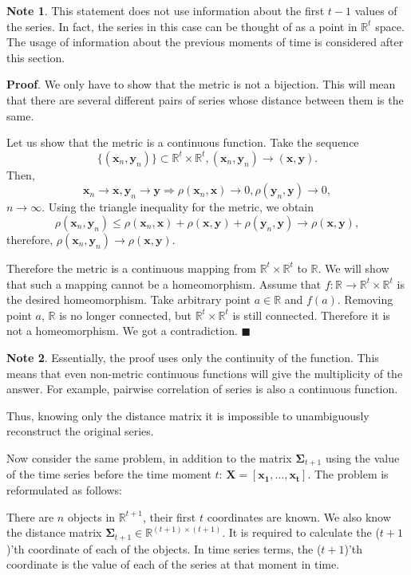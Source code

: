 \documentclass[12pt]{article}
\begin{document}
\textbf{Note 1}. This statement does not use information about the first $t-1$ values of the series. In fact, the series in this case can be thought of as a point in $\mathbb{R}^t$ space. The usage of information about the previous moments of time is considered after this section.

\textbf{Proof}. We only have to show that the metric is not a bijection. This will mean that there are several different pairs of series whose distance between them is the same.

Let us show that the metric is a continuous function. Take the sequence \[\{(\mathbf{x}_n, \mathbf{y}_n)\} \subset \mathbb{R}^t \times \mathbb{R}^t, (\mathbf{x}_n, \mathbf{y}_n) \to (\mathbf{x}, \mathbf{y}).\] Then, \[\mathbf{x}_n\to \mathbf{x}, \mathbf{y}_n\to \mathbf{y} \Rightarrow \rho(\mathbf{x}_n,\mathbf{x})\to 0 ,\rho(\mathbf{y}_n,\mathbf{y})\to 0,\] $n \to \infty.$ Using the triangle inequality for the metric, we obtain \[\rho(\mathbf{x}_n,\mathbf{y}_n)\leqslant \rho(\mathbf{x}_n,\mathbf{x})+\rho(\mathbf{x},\mathbf{y})+\rho(\mathbf{y}_n,\mathbf{y})\to \rho(\mathbf{x},\mathbf{y}),\] therefore, $\rho(\mathbf{x}_n,\mathbf{y}_n)\to \rho(\mathbf{x},\mathbf{y})$.

Therefore the metric is a continuous mapping from $\mathbb{R}^t \times \mathbb{R}^t$ to $\mathbb{R}$. We will show that such a mapping cannot be a homeomorphism. Assume that $f: \mathbb{R} \to \mathbb{R}^t \times \mathbb{R}^t$ is the desired homeomorphism. Take arbitrary point $a \in \mathbb{R}$ and $f(a)$. Removing point $a$, $\mathbb{R}$ is no longer connected, but $\mathbb{R}^t \times \mathbb{R}^t$ is still connected. Therefore it is not a homeomorphism. We got a contradiction.
$\blacksquare$

\textbf{Note 2}. Essentially, the proof uses only the continuity of the function. This means that even non-metric continuous functions will give the multiplicity of the answer. For example, pairwise correlation of series is also a continuous function.

Thus, knowing only the distance matrix it is impossible to unambiguously reconstruct the original series.

Now consider the same problem, in addition to the matrix $\mathbf{\Sigma}_{t+1}$ using the value of the time series before the time moment $t$: $\mathbf{X}=[\mathbf{x_1}, \ldots, \mathbf{x_{t}}]$. The problem is reformulated as follows:

There are $n$ objects in $\mathbb{R}^{t+1}$, their first $t$ coordinates are known. We also know the distance matrix $\mathbf{\Sigma}_{t+1} \in \mathbb{R}^{(t+1) \times (t+1)}$. It is required to calculate the ($t+1$)'th coordinate of each of the objects. In time series terms, the ($t+1$)'th coordinate is the value of each of the series at that moment in time.
\end{document}
